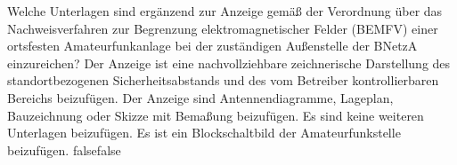     {Welche Unterlagen sind ergänzend zur Anzeige gemäß der Verordnung über das Nachweisverfahren zur Begrenzung elektromagnetischer Felder (BEMFV) einer ortsfesten Amateurfunkanlage bei der zuständigen Außenstelle der BNetzA einzureichen?}
    {Der Anzeige ist eine nachvollziehbare zeichnerische Darstellung des standortbezogenen Sicherheitsabstands und des vom Betreiber kontrollierbaren Bereichs beizufügen.}
    {Der Anzeige sind Antennendiagramme, Lageplan, Bauzeichnung oder Skizze mit Bemaßung beizufügen.}
    {Es sind keine weiteren Unterlagen beizufügen.}
    {Es ist ein Blockschaltbild der Amateurfunkstelle beizufügen.}
    {false}{false}